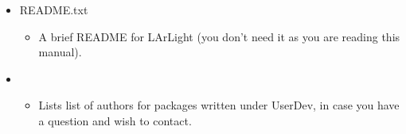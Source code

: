 \begin{itemize}
    \item {\ttfamily README.txt}
      \begin{itemize}
          \item A brief README for LArLight (you don't need it as you are reading this manual).
      \end{itemize}

    \item {}
      \begin{itemize}
          \item Lists list of authors for packages written under UserDev, in case you have a question and wish to contact.
      \end{itemize}
\end{itemize}
